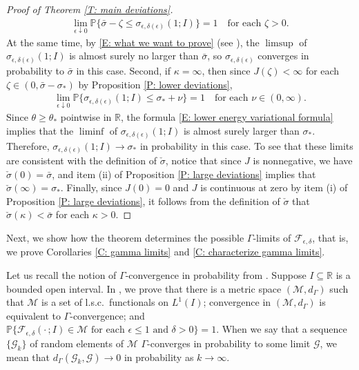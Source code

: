 \documentclass[12pt]{amsart}
\begin{document}
\begin{proof}[Proof of Theorem \ref{T: main deviations}]
	\begin{align*}
		\lim_{ \epsilon \downarrow 0 } \mathbb{P} \{  \bar{\sigma} - \zeta \leq \sigma_{\epsilon,\delta(\epsilon)}(1; I ) \} = 1 \quad \text{for each} \, \, \zeta > 0.
	\end{align*}
At the same time, by \eqref{E: what we want to prove} (see \cite[Theorem 2]{part1}), the $\limsup$ of $\sigma_{\epsilon,\delta(\epsilon)}(1;I)$ is almost surely no larger than $\bar{\sigma}$, so $\sigma_{\epsilon,\delta(\epsilon)}$ converges in probability to $\bar{\sigma}$ in this case.
Second, if $\kappa = \infty$, then since $J(\zeta) < \infty$ for each $\zeta \in (0,\bar{\sigma} - \sigma_{*})$ by Proposition \ref{P: lower deviations}, 
	\begin{align*}
		\lim_{ \epsilon \downarrow 0 } \mathbb{P} \{  \sigma_{\epsilon,\delta(\epsilon)}(1; I ) \leq \sigma_{*} + \nu \} = 1 \quad \text{for each} \, \, \nu \in (0,\infty).
	\end{align*}
Since $\theta \geq \theta_{*}$ pointwise in $\mathbb{R}$, the formula \eqref{E: lower energy variational formula} implies that the $\liminf$ of $\sigma_{\epsilon,\delta(\epsilon)}(1;I)$ is almost surely larger than $\sigma_{*}$.  Therefore, $\sigma_{\epsilon,\delta(\epsilon)}(1;I) \to \sigma_{*}$ in probability in this case.  To see that these limits are consistent with the definition of $\check{\sigma}$, notice that since $J$ is nonnegative, we have $\check{\sigma}(0) = \bar{\sigma}$, and item (ii) of Proposition \ref{P: large deviations} implies that $\check{\sigma}(\infty) = \sigma_{*}$. Finally, since $J(0) = 0$ and $J$ is continuous at zero by item (i) of Proposition \ref{P: large deviations}, it follows from the definition of $\check{\sigma}$ that $\check{\sigma}(\kappa) < \bar{\sigma}$ for each $\kappa > 0$.
\end{proof}

Next, we show how the theorem determines the possible $\Gamma$-limits of $\mathscr{F}_{\epsilon,\delta}$, that is, we prove Corollaries \ref{C: gamma limits} and \ref{C: characterize gamma limits}.

Let us recall the notion of $\Gamma$-convergence in probability from \cite{part1}.  Suppose $I \subseteq \mathbb{R}$ is a bounded open interval.  In \cite[Appendix B]{part1}, we prove that there is a metric space $(\mathcal{M},d_{\Gamma})$ such that $\mathcal{M}$ is a set of l.s.c.\ functionals on $L^{1}(I)$;  convergence in $(\mathcal{M},d_{\Gamma})$ is equivalent to $\Gamma$-convergence; and $\mathbb{P} \{ \mathscr{F}_{\epsilon,\delta}(\cdot \, ; I ) \in \mathcal{M} \, \, \text{for each} \, \, \epsilon \leq 1 \, \, \text{and} \, \, \delta > 0 \} = 1$.  When we say that a sequence $\{ \mathscr{G}_{k} \}$ of random elements of $\mathcal{M}$ $\Gamma$-converges in probability to some limit $\mathscr{G}$, we mean that $d_{\Gamma}(\mathscr{G}_{k},\mathscr{G}) \to 0$ in probability as $k \to \infty$. 
\end{document}

